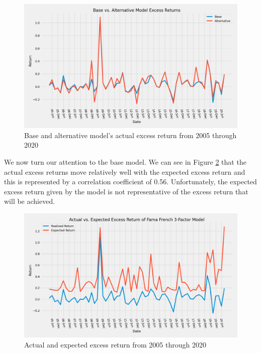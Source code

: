 \documentclass[final]{article}
\begin{document}
\begin{figure}[ht]
    \centering
    \includegraphics[width=1\textwidth]{base_vs_alternative_returns.png}
    \caption{Base and alternative model's actual excess return from 2005 through 2020}
    \label{fig:1}
\end{figure}

We now turn our attention to the base model. We can see in Figure \ref{fig:2} that the actual excess returns move relatively well with the expected excess return and this is represented by a correlation coefficient of 0.56. Unfortunately, the expected excess return given by the model is not representative of the excess return that will be achieved.

\begin{figure}[ht]
    \centering
    \includegraphics[width=1\textwidth]{actual_vs_expected_returns.png}
    \caption{Actual and expected excess return from 2005 through 2020}
    \label{fig:2}
\end{figure}
\end{document}
